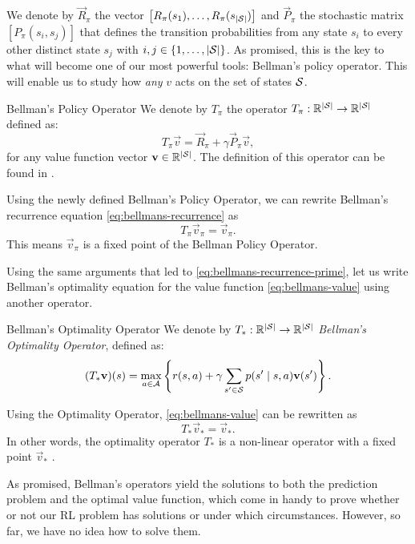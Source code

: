 We denote by $\vec{R}_\pi$ the vector $\left[ R_\pi(s_1), \dots, R_\pi
(s_{|\mathcal{S}|}) \right]$ and $\vec{P}_\pi$ the stochastic matrix $\left[
P_\pi(s_i, s_j) \right]$ that defines the transition probabilities from any
state $s_i$ to every other distinct state $s_j$ with $i, j \in \left\{ 1, \dots,
|\mathcal{S}| \right\}$. As promised, this is the key to what will become one of our
most powerful tools: Bellman's policy operator.  This will enable us to study
how \textit{any} $v$ acts on the set of states $\mathcal{S}$.

\begin{dfn}{Bellman's Policy Operator}{}
    We denote by $T_\pi$ the operator $T_\pi: \mathbb{R}^{|\mathcal{S}|} \to \mathbb{R}^{|\mathcal{S}|}$
    defined as:
    \[
        T_\pi \vec{v} = \vec{R}_\pi + \gamma \vec{P}_\pi \vec{v},
    \]
    for any value function vector $\mathbf{v} \in \mathbb{R}^{|\mathcal{S}|}$. The definition
    of this operator can be found in \cite[Ch.~5.4]{raoRL4F}.
\end{dfn}

Using the newly defined Bellman's Policy Operator, we can rewrite Bellman's
recurrence equation \eqref{eq:bellmans-recurrence} as
\[
    T_\pi \vec{v}_\pi = \vec{v}_\pi.
\]
This means $\vec{v}_\pi$ is a fixed point of the Bellman Policy Operator.

Using the same arguments that led to \eqref{eq:bellmans-recurrence-prime}, let
us write Bellman's optimality equation for the value function
\eqref{eq:bellmans-value} using another operator.

\begin{dfn}{Bellman's Optimality Operator}{}
    We denote by $T_*: \mathbb{R}^{|\mathcal{S}|} \to \mathbb{R}^{|\mathcal{S}|}$ \emph{Bellman's Optimality Operator}, defined as:
    \[
        (T_{*} \mathbf{v})(s) = \max_{a \in \mathcal{A}} \left\{ r(s, a) + \gamma \sum_{s' \in \mathcal{S}} p(s' \mid s, a) \mathbf{v}(s') \right\}. 
    \]
\end{dfn}

Using the Optimality Operator, \eqref{eq:bellmans-value} can be rewritten as
\begin{equation}
    \label{eq:bellmans-optimality-operators}
    T_* \vec{v}_{*} = \vec{v}_{*}.
\end{equation}
In other words, the optimality operator $T_*$ is a non-linear operator with a
fixed point $\vec{v}_*$ \cite[Ch.~5.4]{raoRL4F}.

As promised, Bellman's operators yield the solutions to both the prediction
problem and the optimal value function, which come in handy to prove whether or
not our RL problem has solutions or under which circumstances. However, so far,
we have no idea how to solve them.

